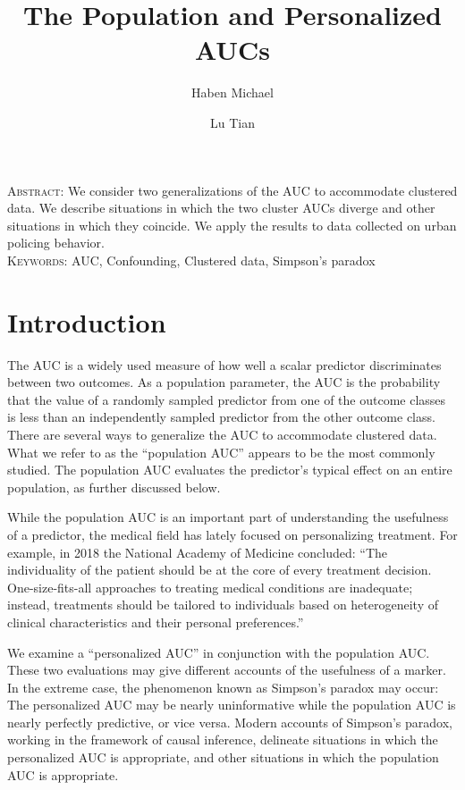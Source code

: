 \documentclass[12pt]{article}
\title{The Population and Personalized AUCs}
\author[1]{Haben Michael}
\author[2]{Lu Tian}
\affil[1]{Department of Mathematics and Statistics, University of Massachusetts}
\affil[2]{Department of Biomedical Data Science, Stanford University}
\date{}
\begin{document}
\maketitle
\noindent\textsc{Abstract:} We consider two generalizations of the AUC to accommodate
clustered data. We describe situations in which the two cluster AUCs
diverge and other situations in which they coincide. We apply the
results to data collected on urban policing behavior.\\
\textsc{Keywords:} AUC, Confounding, Clustered data, Simpson's paradox

\section{Introduction}
The AUC is a widely used measure of how well a scalar predictor
discriminates between two outcomes. As a population parameter, the AUC
is the probability that the value of a randomly sampled predictor from
one of the outcome classes is less than an independently sampled
predictor from the other outcome class. There are several ways to
generalize the AUC to accommodate clustered data. What we refer to as
the ``population AUC'' appears to be the most commonly studied. The
population AUC evaluates the predictor's typical effect on an entire
population, as further discussed below.

While the population AUC is an important part of understanding the
usefulness of a predictor, the medical field has lately focused on
personalizing treatment. %
For example, in 2018 the National Academy of Medicine concluded: ``The
individuality of the patient should be at the core of every treatment
decision. One-size-fits-all approaches to treating medical conditions
are inadequate; instead, treatments should be tailored to individuals
based on heterogeneity of clinical characteristics and their personal
preferences.''

We examine a ``personalized AUC'' in conjunction with the population
AUC.  These two evaluations may give different accounts of the
usefulness of a marker. In the extreme case, the phenomenon known as
Simpson's paradox may occur: The personalized AUC may be nearly
uninformative while the population AUC is nearly perfectly
predictive, or vice versa. Modern accounts of Simpson's paradox,
working in the framework of causal inference, delineate situations in
which the personalized AUC is appropriate, and other situations in which
the population AUC is appropriate.
\end{document}
